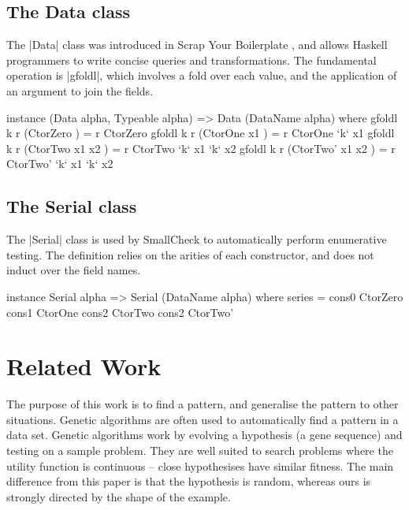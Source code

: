 \documentclass{llncs}
\begin{document}
\subsection{The Data class}

The |Data| class was introduced in Scrap Your Boilerplate \cite{lammel:syb}, and allows Haskell programmers to write concise queries and transformations. The fundamental operation is |gfoldl|, which involves a fold over each value, and the application of an argument to join the fields.

\begin{code}
instance (Data alpha, Typeable alpha) => Data (DataName alpha) where
    gfoldl k r (CtorZero         ) = r CtorZero
    gfoldl k r (CtorOne   x1     ) = r CtorOne   `k` x1
    gfoldl k r (CtorTwo   x1 x2  ) = r CtorTwo   `k` x1 `k` x2
    gfoldl k r (CtorTwo'  x1 x2  ) = r CtorTwo'  `k` x1 `k` x2
\end{code}

\subsection{The Serial class}

The |Serial| class is used by SmallCheck \cite{smallcheck} to automatically perform enumerative testing. The definition relies on the arities of each constructor, and does not induct over the field names.

\begin{code}
instance Serial alpha => Serial (DataName alpha) where
    series = cons0 CtorZero \/ cons1 CtorOne  \/ cons2 CtorTwo  \/ cons2 CtorTwo'
\end{code}

\section{Related Work}
\label{sec:related}

The purpose of this work is to find a pattern, and generalise the pattern to other situations. Genetic algorithms \cite{genetic_algorithms} are often used to automatically find a pattern in a data set. Genetic algorithms work by evolving a hypothesis (a gene sequence) and testing on a sample problem. They are well suited to search problems where the utility function is continuous -- close hypothesises have similar fitness. The main difference from this paper is that the hypothesis is random, whereas ours is strongly directed by the shape of the example.
\end{document}

